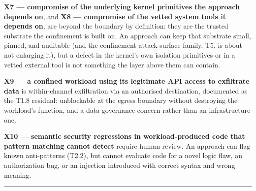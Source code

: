 \textbf{X7 --- compromise of the underlying kernel primitives the
approach depends on}, and \textbf{X8 --- compromise of the vetted system
tools it depends on}, are beyond the boundary by definition: they are
the trusted substrate the confinement is built on. An approach can keep
that substrate small, pinned, and auditable (and the
confinement-attack-surface family, T5, is about not enlarging it), but a
defect in the kernel's own isolation primitives or in a vetted external
tool is not something the layer above them can contain.

\textbf{X9 --- a confined workload using its legitimate API access to
exfiltrate data} is within-channel exfiltration via an authorised
destination, documented as the T1.8 residual: unblockable at the egress
boundary without destroying the workload's function, and a
data-governance concern rather than an infrastructure one.

\textbf{X10 --- semantic security regressions in workload-produced code
that pattern matching cannot detect} require human review. An approach
can flag known anti-patterns (T2.2), but cannot evaluate code for a
novel logic flaw, an authorization bug, or an injection introduced with
correct syntax and wrong meaning.

\begin{center}\rule{0.5\linewidth}{0.5pt}\end{center}
